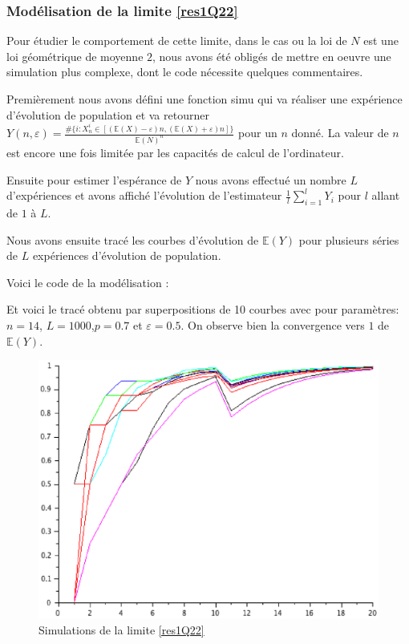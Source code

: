 \documentclass[12pt]{article}
\newcommand{\esp}{\mathbb{E}}
\begin{document}
			\subsubsection*{Modélisation de la limite \ref{res1Q22}}
				Pour étudier le comportement de cette limite, dans le cas ou la loi de $N$ est une loi géométrique de moyenne $2$, nous avons été obligés de mettre en oeuvre une simulation plus complexe, dont le code nécessite quelques commentaires.
				
				Premièrement nous avons défini une fonction \textsf{simu} qui va réaliser une expérience d'évolution de population et va retourner $Y(n,\varepsilon)=\frac{\#\{i:X_n^i\in[(\esp(X)-\varepsilon)n,(\esp(X)+\varepsilon)n]\}}{\esp(N)^n}$  pour un $n$ donné. La valeur de $n$ est encore une fois limitée par les capacités de calcul de l'ordinateur.
				
				Ensuite pour estimer l'espérance de $Y$ nous avons effectué un nombre $L$ d'expériences et avons affiché l'évolution de l'estimateur $\frac{1}{l}\sum\limits_{i=1}^{l}Y_i$ pour $l$ allant de $1$ à $L$.
				
				Nous avons ensuite tracé les courbes d'évolution de $\esp(Y)$ pour plusieurs séries de $L$ expériences d'évolution de population.
				
				Voici le code de la modélisation :
				\begin{mdframed}
						
				\end{mdframed}
				
				Et voici le tracé obtenu par superpositions de 10 courbes avec pour paramètres: $n=14$, $L=1000$,$p=0.7$ et $\varepsilon=0.5$. On observe bien la convergence vers $1$ de $\esp(Y)$.
				
				\begin{figure}[H]
					\centering
					\caption{Simulations de la limite \ref{res1Q22}}
					\includegraphics[width=\textwidth]{../Scilab/Images/2_3_2.eps}
				\end{figure}
				
\end{document}
